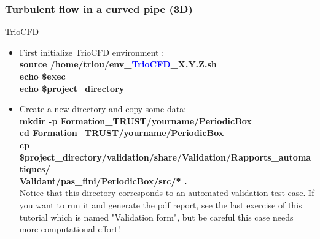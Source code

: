 \documentclass[10pt, hyperref={unicode=true,pdfusetitle, bookmarks=true,bookmarksnumbered=false,bookmarksopen=false, breaklinks=false,pdfborder={0 0 1},backref=true,colorlinks=true,linkcolor=darkblue,pageanchor}]{beamer}
\begin{document}
\begin{frame}
\frametitle{Turbulent flow in a curved pipe (3D)}
\begin{block}{TrioCFD}

\begin{itemize}
\item First initialize TrioCFD environment :\\
{\small{
\textbf{source /home/triou/env\_\textcolor{blue}{TrioCFD}\_X.Y.Z.sh }\\
\textbf{echo \$exec} \\
\textbf{echo \$project\_directory} \\
}}

\item Create a new directory and copy some data:\\
{\small{
\textbf{mkdir -p Formation\_TRUST/yourname/PeriodicBox} \\
\textbf{cd Formation\_TRUST/yourname/PeriodicBox} \\
\textbf{cp \$project\_directory/validation/share/Validation/Rapports\_automatiques/} \\
\hspace{4cm} \textbf{Validant/pas\_fini/PeriodicBox/src/* \; .} \\
}}
\vspace{0.2cm}
Notice that this directory corresponds to an automated validation test case. 
If you want to run it and generate the pdf report, see the last exercise of this tutorial which is named "Validation form", but be careful this case needs more computational effort!
\end{itemize}

\end{block}
\end{frame}
\end{document}
